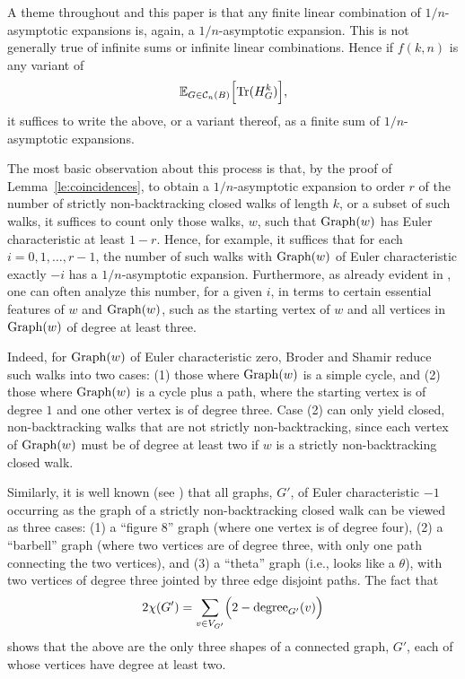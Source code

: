 \documentclass{memo-l}
\theoremstyle{plain}
\theoremstyle{definition}
\numberwithin{section}{chapter}
\numberwithin{equation}{chapter}
\newcommand{\cal}{\mathcal}
\newcommand{\cc}{{\cal C}}
\DeclareMathOperator{\Tr}{Tr}
\theoremstyle{plain}
\theoremstyle{definition}
\newcommand\EE{\mathbb{E}}
\begin{document}
A theme throughout \cite{friedman_random_graphs,friedman_alon} and this
paper is that any finite linear combination
of $1/n$-asymptotic expansions is, again, a $1/n$-asymptotic expansion.
This is not generally true of infinite sums or infinite linear combinations.
Hence if $f(k,n)$ is any variant of 
$$
\EE_{G\in\cc_n(B)} \Bigl[ \Tr(H_G^k) \Bigr],
$$
it suffices to write the above, or a variant thereof, as a finite sum
of $1/n$-asymptotic expansions.

The most basic observation about this process is that, by the proof of
Lemma~\ref{le:coincidences}, to obtain a $1/n$-asymptotic expansion
to order $r$
of the number of strictly non-backtracking closed walks of length
$k$, or a subset of such walks,
it suffices to count only those walks, $w$, such that ${\rm Graph}(w)$
has Euler characteristic at least $1-r$.
Hence, for example, it suffices that for each $i=0,1,\ldots,r-1$, the
number of such walks with ${\rm Graph}(w)$ of Euler characteristic exactly
$-i$ has a $1/n$-asymptotic expansion.
Furthermore, as already evident in \cite{broder}, one can often analyze
this number, for a given $i$, in terms to certain essential features of
$w$ and ${\rm Graph}(w)$, such as the starting vertex of $w$ and all
vertices in ${\rm Graph}(w)$ of degree at least three.

Indeed, for ${\rm Graph}(w)$ of Euler characteristic zero, Broder and
Shamir reduce such walks into two cases: (1) those where ${\rm Graph}(w)$
is a simple cycle, and (2) those where ${\rm Graph}(w)$ is a cycle plus
a path, where the starting vertex is of degree $1$ and one other vertex
is of degree three. Case (2) can only yield closed, non-backtracking walks
that are not strictly non-backtracking, since each vertex of ${\rm Graph}(w)$
must be of degree at least two if $w$ is a strictly non-backtracking
closed walk.

Similarly, it is well known (see \cite{linial_puder}) that all
graphs, $G'$, of Euler characteristic $-1$ 
occurring as the graph of a strictly non-backtracking closed walk can be viewed
as three cases: (1) a ``figure 8'' graph (where one vertex is of degree four),
(2) a ``barbell'' graph (where two vertices are of degree three, with only
one path connecting the two vertices), and
(3) a ``theta'' graph (i.e., looks like a $\theta$), 
with two vertices of degree three jointed by three
edge disjoint paths.  The fact that
$$
2\chi(G') = \sum_{v\in V_{G'}} \Bigl(2 - {\rm degree}_{G'}(v) \Bigr)
$$
shows that the above are the only three shapes of a connected graph, $G'$,
each of whose vertices have degree at least two.
\end{document}

